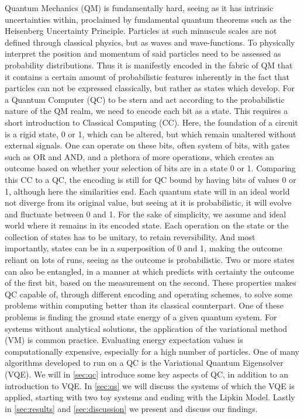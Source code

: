 Quantum Mechanics (QM) is fundamentally hard, seeing as it has intrinsic uncertainties within, proclaimed by fundamental quantum theorems such as the Heisenberg Uncertainty Principle. Particles at such minuscule scales are not defined through classical physics, but as waves and wave-functions. To physically interpret the position and momentum of said particles need to be assessed as probability distributions. Thus it is manifestly encoded in the fabric of QM that it contains a certain amount of probabilistic features inherently in the fact that particles can not be expressed classically, but rather as states which develop. 
\newline\newline
For a Quantum Computer (QC) to be stern and act according to the probabilistic nature of the QM realm, we need to encode each bit as a state. This requires a short introduction to Classical Computing (CC). Here, the foundation of a circuit is a rigid state, 0 or 1, which can be altered, but which remain unaltered without external signals. One can operate on these bits, often system of bits, with gates such as OR and AND, and a plethora of more operations, which creates an outcome based on whether your selection of bits are in a state 0 or 1. 
\newline\newline
Comparing this CC to a QC, the encoding is still for QC bound by having bits of values 0 or 1, although here the similarities end. Each quantum state will in an ideal world not diverge from its original value, but seeing at it is probabilistic, it will evolve and fluctuate between 0 and 1. For the sake of simplicity, we assume and ideal world where it remains in its encoded state. Each operation on the state or the collection of states has to be unitary, to retain reversibility. And most importantly, states can be in a superposition of 0 and 1, making the outcome reliant on lots of runs, seeing as the outcome is probabilistic. Two or more states can also be entangled, in a manner at which predicts with certainty the outcome of the first bit, based on the measurement on the second. These properties makes QC capable of, through different encoding and operating schemes, to solve some problems within computing better than its classical counterpart. 
\newline\newline
One of these problems is finding the ground state energy of a given quantum system. For systems without analytical solutions, the application of the variational method (VM) is common practice. Evaluating energy expectation values is computationally expensive, especially for a high number of particles. One of many algorithms developed to run on a QC is the Variational Quantum Eigensolver (VQE). We will in \cref{sec:qc} introduce some key aspects of QC, in addition to an introduction to VQE. In \cref{sec:qs} we will discuss the systems of which the VQE is applied, starting with two toy systems and ending with the Lipkin Model. Lastly in \cref{sec:results} and \cref{sec:discussion} we present and discuss our findings. 

